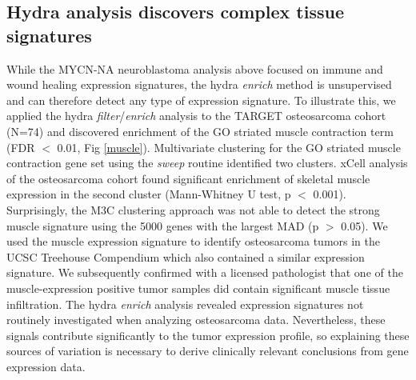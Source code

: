 \documentclass[10pt,letterpaper]{article}
\begin{document}
\subsection*{Hydra analysis discovers complex tissue signatures}
While the MYCN-NA neuroblastoma analysis above focused on immune and wound healing expression signatures, the hydra \textit{enrich} method is unsupervised and can therefore detect any type of expression signature. To illustrate this, we applied the hydra \textit{filter}/\textit{enrich} analysis to the TARGET osteosarcoma cohort (N=74) and discovered enrichment of the GO striated muscle contraction term (FDR $<$ 0.01, Fig \ref{muscle}). Multivariate clustering for the GO striated muscle contraction gene set using the \textit{sweep} routine identified two clusters. xCell analysis of the osteosarcoma cohort found significant enrichment of skeletal muscle expression in the second cluster (Mann-Whitney U test, p $<$ 0.001). Surprisingly, the M3C clustering approach was not able to detect the strong muscle signature using the 5000 genes with the largest MAD (p $>$ 0.05). We used the muscle expression signature to identify osteosarcoma tumors in the UCSC Treehouse Compendium which also contained a similar expression signature. We subsequently confirmed with a licensed pathologist that one of the muscle-expression positive tumor samples did contain significant muscle tissue infiltration. The hydra \textit{enrich} analysis revealed expression signatures not routinely investigated when analyzing osteosarcoma data. Nevertheless, these signals contribute significantly to the tumor expression profile, so explaining these sources of variation is necessary to derive clinically relevant conclusions from gene expression data.
\end{document}
